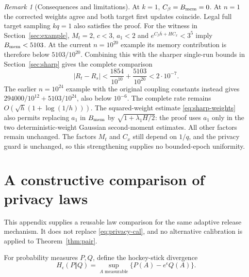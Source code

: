 \documentclass[a4paper,11pt]{article}
\theoremstyle{remark}
\newtheorem{remark}[theorem]{Remark}
\begin{document}
\begin{remark}[Consequences and limitations]
At $k=1$, $C_\beta=B_{\rm mem}=0$. At $n=1$ the corrected weights agree
and both target first updates coincide. Legal full target sampling $kq=1$
also satisfies the proof. For the witness in Section~\ref{sec:example},
$M_t=2$, $c<3$, $a_1<2$ and
$e^{C_\beta\bar h+HC_x}<3^5$ imply $B_{\rm mem}<5103$.
At the current $n=10^{20}$ example its memory contribution is therefore
below $5103/10^{20}$. Combining this with the sharper single-run bounds
in Section~\ref{sec:sharp} gives the complete comparison
\[
 |R_t-R_s|<\frac{1854}{10^{10}}+\frac{5103}{10^{20}}<2\cdot10^{-7}.
\]
The earlier $n=10^{24}$ example with the original coupling constants
instead gives $294000/10^{12}+5103/10^{24}$, also below $10^{-6}$.
The complete rate remains $O(\sqrt h(1+\log(1/h)))$.
The squared-weight estimate \eqref{eq:sharp-weights} also permits replacing
$a_1$ in $B_{\rm mem}$ by $\sqrt{1+\lambda_1H/2}$: the proof uses
$a_1$ only in the two deterministic-weight Gaussian second-moment estimates.
All other factors remain unchanged.
The factors $M_t$ and $C_x$ still depend on $1/q$, and the privacy guard
is unchanged, so this strengthening supplies no bounded-epoch uniformity.
\end{remark}

\section{A constructive comparison of privacy laws}\label{app:canonical}

This appendix supplies a reusable law comparison for the same adaptive
release mechanism. It does not replace \eqref{eq:privacy-cal}, and no
alternative calibration is applied to Theorem~\ref{thm:pair}.

For probability measures $P,Q$, define the hockey-stick divergence
\[
 H_\epsilon(P\Vert Q)=\sup_{A\text{ measurable}}
                       \{P(A)-e^\epsilon Q(A)\}.
\]
\end{document}
